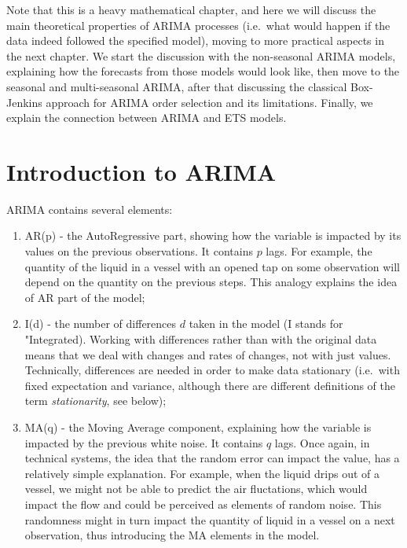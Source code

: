 \documentclass[
]{book}
\providecommand{\tightlist}{%
  \setlength{\itemsep}{0pt}\setlength{\parskip}{0pt}}
\theoremstyle{definition}
\theoremstyle{definition}
\theoremstyle{definition}
\theoremstyle{definition}
\theoremstyle{remark}
\begin{document}
Note that this is a heavy mathematical chapter, and here we will discuss the main theoretical properties of ARIMA processes (i.e.~what would happen if the data indeed followed the specified model), moving to more practical aspects in the next chapter. We start the discussion with the non-seasonal ARIMA models, explaining how the forecasts from those models would look like, then move to the seasonal and multi-seasonal ARIMA, after that discussing the classical Box-Jenkins approach for ARIMA order selection and its limitations. Finally, we explain the connection between ARIMA and ETS models.

\hypertarget{ARIMAIntro}{%
\section{Introduction to ARIMA}\label{ARIMAIntro}}

ARIMA contains several elements:

\begin{enumerate}
\def\labelenumi{\arabic{enumi}.}
\tightlist
\item
  AR(p) - the AutoRegressive part, showing how the variable is impacted by its values on the previous observations. It contains \(p\) lags. For example, the quantity of the liquid in a vessel with an opened tap on some observation will depend on the quantity on the previous steps. This analogy explains the idea of AR part of the model;
\item
  I(d) - the number of differences \(d\) taken in the model (I stands for "Integrated). Working with differences rather than with the original data means that we deal with changes and rates of changes, not with just values. Technically, differences are needed in order to make data stationary (i.e.~with fixed expectation and variance, although there are different definitions of the term \emph{stationarity}, see below);
\item
  MA(q) - the Moving Average component, explaining how the variable is impacted by the previous white noise. It contains \(q\) lags. Once again, in technical systems, the idea that the random error can impact the value, has a relatively simple explanation. For example, when the liquid drips out of a vessel, we might not be able to predict the air fluctations, which would impact the flow and could be perceived as elements of random noise. This randomness might in turn impact the quantity of liquid in a vessel on a next observation, thus introducing the MA elements in the model.
\end{enumerate}
\end{document}
